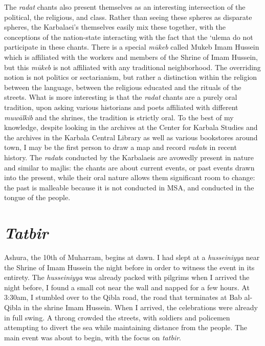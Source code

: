 The \emph{radat} chants also present themselves as an interesting intersection of the political, the religious, and class. Rather than seeing these spheres as disparate spheres, the Karbalaei’s themselves easily mix these together, with the conceptions of the nation-state interacting with the fact that the ‘ulema do not participate in these chants. There is a special \emph{mūkeb} called Mukeb Imam Hussein which is affiliated with the workers and members of the Shrine of Imam Hussein, but this \emph{mūkeb} is not affiliated with any traditional neighborhood. The overriding notion is not politics or sectarianism, but rather a distinction within the religion between the language, between the religious educated and the rituals of the streets. What is more interesting is that the \emph{radat} chants are a purely oral tradition, upon asking various historians and poets affiliated with different \emph{muwālkib} and the shrines, the tradition is strictly oral. To the best of my knowledge, despite looking in the archives at the Center for Karbala Studies and the archives in the Karbala Central Library as well as various bookstores around town, I may be the first person to draw a map and record \emph{radat}s in recent history. The \emph{radat}s conducted by the Karbalaeis are avowedly present in nature and similar to majlis: the chants are about current events, or past events drawn into the present, while their oral nature allows them significant room to change: the past is malleable because it is not conducted in MSA, and conducted in the tongue of the people. 

\section{\emph{Tatbir}}
Ashura, the 10th of Muharram, begins at dawn. I had slept at a \emph{husseiniyya} near the Shrine of Imam Hussein the night before in order to witness the event in its entirety. The \emph{husseiniyya} was already packed with pilgrims when I arrived the night before, I found a small cot near the wall and napped for a few hours. At 3:30am, I stumbled over to the Qibla road, the road that terminates at Bab al-Qibla in the shrine Imam Hussein. When I arrived, the celebrations were already in full swing. A throng crowded the streets, with soldiers and policemen attempting to divert the sea while maintaining distance from the people. The main event was about to begin, with the focus on \emph{tatbir}. 

